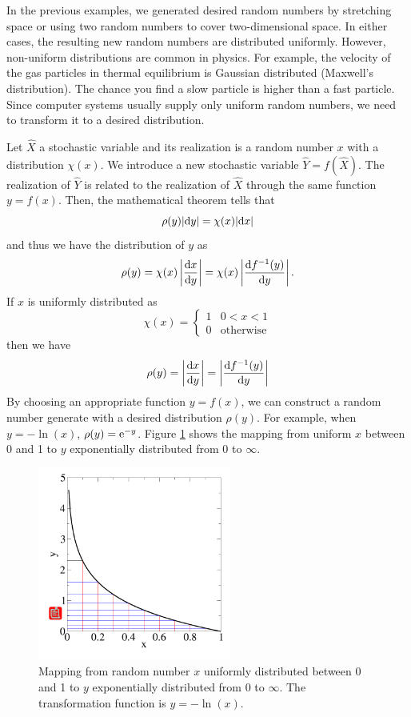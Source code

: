 In the previous examples, we generated desired random numbers by stretching space or using two random numbers to cover two-dimensional space.
In either cases, the resulting new random numbers are distributed uniformly.  However, non-uniform distributions are common in physics.  For example, the velocity of the gas particles in thermal equilibrium is Gaussian distributed (Maxwell's distribution).  The chance you find a slow particle is higher than a fast particle.  Since computer systems usually supply only uniform random numbers, we need to transform it to a desired distribution.

Let $\hat{X}$  a stochastic variable and  its realization is a random number $x$ with a distribution $\chi(x)$. We introduce a new stochastic variable $\hat{Y}=f(\hat{X})$.  The realization of $\hat{Y}$ is related to the realization of $\hat{X}$ through the same function $y=f(x)$.
Then, the mathematical theorem tells that
\begin{equation}
\rho(y) |\text{d} y| = \chi(x) |\text{d} x|
\end{equation}
and thus we have the distribution of $y$ as
\begin{equation}\label{eq:1d_transform1}
\rho(y) = \chi(x)\left | \frac{\text{d} x}{\text{d} y} \right | = \chi(x) \left | \frac{ \text{d} f^{-1}(y)}{\text{d} y} \right |.
\end{equation}
If $x$ is uniformly distributed as
\begin{equation}\label{eq:uni_dist}
\chi(x) = \begin{cases} 1 & 0<x<1 \\[1ex]
0 & \text{otherwise} \end{cases}
\end{equation}
then we have
\begin{equation}\label{eq:1d_transform2}
\rho(y) =  \left | \frac{\text{d} x}{\text{d} y} \right | = \left | \frac{ \text{d} f^{-1}(y)}{\text{d} y} \right |
\end{equation}
By choosing an appropriate function $y=f(x)$, we can construct a random number generate with a desired distribution $\rho(y)$.  For example,
when $y=-\ln(x)$, $\rho(y)=\text{e}^{-y}$.  Figure \ref{fig:expmap} shows the mapping from uniform $x$ between 0 and 1 to $y$ exponentially distributed from 0 to $\infty$.


\begin{figure}
\centering
\includegraphics[width=2.5in]{15.Random-Numbers/expmap.pdf}
\caption{Mapping from random number $x$ uniformly distributed between 0 and 1 to $y$ exponentially distributed from 0 to $\infty$.  The transformation function is $y=-\ln(x)$.}
\label{fig:expmap}
\end{figure}


